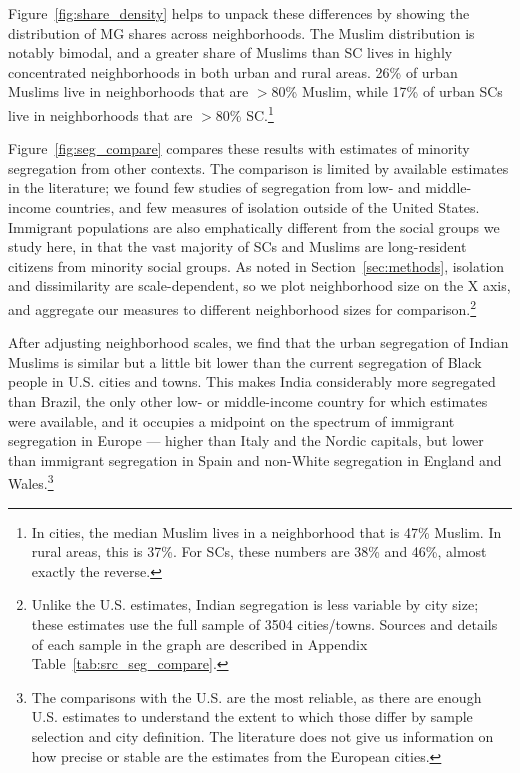 \documentclass[12pt]{article}
\begin{document}
Figure~\ref{fig:share_density} helps to unpack these differences by showing the distribution of MG shares across neighborhoods. The Muslim distribution is notably bimodal, and a greater share of Muslims than SC lives in highly concentrated neighborhoods in both urban and rural areas. 26\% of urban Muslims live in neighborhoods that are $>$80\% Muslim, while 17\% of urban SCs live in neighborhoods that are $>$80\% SC.\footnote{In cities, the median Muslim lives in a neighborhood that is 47\% Muslim. In rural areas, this is 37\%. For SCs, these numbers are 38\% and 46\%, almost exactly the reverse.}

Figure~\ref{fig:seg_compare} compares these results with estimates of minority segregation from other contexts. The comparison is limited by available estimates in the literature; we found few studies of segregation from low- and middle-income countries, and few measures of isolation outside of the United States. Immigrant populations are also emphatically different from the social groups we study here, in that the vast majority of SCs and Muslims are long-resident citizens from minority social groups. As noted in Section~\ref{sec:methods}, isolation and dissimilarity are scale-dependent, so we plot neighborhood size on the X axis, and aggregate our measures to different neighborhood sizes for comparison.\footnote{Unlike the U.S. estimates, Indian segregation is less variable by city size; these estimates use the full sample of 3504 cities/towns. Sources and details of each sample in the graph are described in Appendix Table~\ref{tab:src_seg_compare}.}

After adjusting neighborhood scales, we find that the urban segregation of Indian Muslims is similar but a little bit lower than the current segregation of Black people in U.S. cities and towns. This makes India considerably more segregated than Brazil, the only other low- or middle-income country for which estimates were available, and it occupies a midpoint on the spectrum of immigrant segregation in Europe --- higher than Italy and the Nordic capitals, but lower than immigrant segregation in Spain and non-White segregation in England and Wales.\footnote{The comparisons with the U.S. are the most reliable, as there are enough U.S. estimates to understand the extent to which those differ by sample selection and city definition. The literature does not give us information on how precise or stable are the estimates from the European cities.} 
\end{document}
